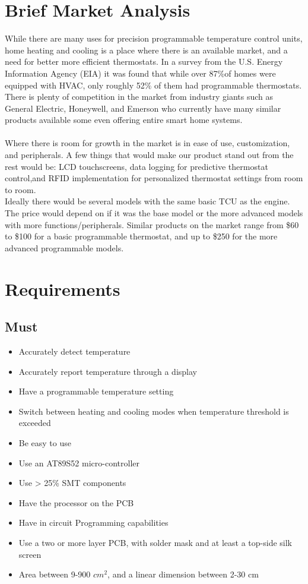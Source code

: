 \documentclass[11pt]{article}
\begin{document}
\section*{Brief Market Analysis} 

While there are many uses for precision programmable temperature control units, home heating and cooling is a place where there is an available market, and a need for better more efficient thermostats. In a survey from the U.S. Energy Information Agency (EIA) it was found that while over 87$\%$of homes were equipped with HVAC, only roughly 52$\%$ of them had programmable thermostats. There is plenty of competition in the market from industry giants such as General Electric, Honeywell, and Emerson who currently have many similar products available some even offering entire smart home systems.
\bigskip
\\
\bigskip
\\
Where there is room for growth in the market is in ease of use, customization, and peripherals. A few things that would make our product stand out from the rest would be: LCD touchscreens, data logging for predictive thermostat control,and RFID implementation for personalized thermostat settings from room to room.
\\
Ideally there would be several models with the same basic TCU as the engine. The price would depend on if it was the base model or the more advanced models with more functions/peripherals. Similar products on the market range from \$60 to \$100 for a basic programmable thermostat, and up to \$250 for the more advanced programmable models.


\section*{Requirements}
\subsection*{Must}
\begin{itemize}
    \item Accurately detect temperature 
    \item Accurately report temperature through a display
    \item Have a programmable temperature setting
    \item Switch between heating and cooling modes when temperature threshold is exceeded 
    \item Be easy to use
    \item Use an AT89S52 micro-controller
    \item Use > 25\% SMT components
    \item Have the processor on the PCB 
    \item Have in circuit Programming capabilities
    \item Use a two or more layer PCB, with solder mask and at least a top-side silk screen
    \item Area between 9-900 $cm^2$, and a linear dimension between 2-30 cm

\end{itemize}
\end{document}
